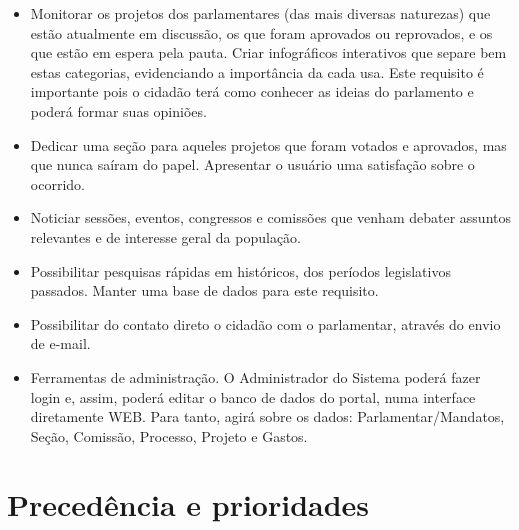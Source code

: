 \documentclass[12pt, a4paper]{article}
\begin{document}
\begin{itemize}
        \item
        Monitorar os projetos dos parlamentares (das mais diversas naturezas)
        que estão atualmente em discussão, os que foram aprovados ou
        reprovados, e os que estão em espera pela pauta. Criar infográficos
        interativos que separe bem estas categorias, evidenciando a importância
        da cada usa. Este requisito é importante pois o cidadão terá como
        conhecer as ideias do parlamento e poderá formar suas opiniões.
        \item
        Dedicar uma seção para aqueles projetos que foram votados e aprovados,
        mas que nunca saíram do papel. Apresentar o usuário uma satisfação
        sobre o ocorrido.
        \item
        Noticiar sessões, eventos, congressos e comissões que venham debater
        assuntos relevantes e de interesse geral da população.
        \item
        Possibilitar pesquisas rápidas em históricos, dos períodos legislativos
        passados. Manter uma base de dados para este requisito.
        \item
        Possibilitar do contato direto o cidadão com o parlamentar, através do
        envio de e-mail.
        \item
        Ferramentas de administração. O Administrador do Sistema poderá fazer login e, assim, poderá editar o banco de dados do portal, numa interface diretamente WEB. Para tanto, agirá sobre os dados: Parlamentar/Mandatos, Seção, Comissão, Processo, Projeto e Gastos. 
    \end{itemize}

    \section{Precedência e prioridades}
\end{document}
